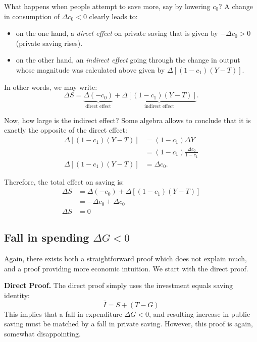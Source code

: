 \documentclass[]{book}
\theoremstyle{definition}
\theoremstyle{definition}
\theoremstyle{definition}
\theoremstyle{remark}
\begin{document}
What happens when people attempt to save more, say by lowering
\(c_{0}\)? A change in consumption of \(\Delta c_{0}<0\) clearly leads
to:

\begin{itemize}
\item
  on the one hand, a \emph{direct effect} on private saving that is
  given by \(-\Delta c_{0}>0\) (private saving rises).
\item
  on the other hand, an \emph{indirect effect} going through the change
  in output whose magnitude was calculated above given by
  \(\Delta\left[\left(1-c_{1}\right)\left(Y-T\right)\right]\).
\end{itemize}

In other words, we may write:
\[\Delta S=\underbrace{\Delta(-c_{0})}_{\text{direct effect}}+\underbrace{\Delta\left[\left(1-c_{1}\right)\left(Y-T\right)\right]}_{\text{indirect effect}}.\]

Now, how large is the indirect effect? Some algebra allows to conclude
that it is exactly the opposite of the direct effect: \[\begin{aligned}
\Delta\left[\left(1-c_{1}\right)\left(Y-T\right)\right] &=(1-c_{1})\Delta Y\\
    &=(1-c_{1})\frac{\Delta c_{0}}{1-c_{1}}\\
\Delta\left[\left(1-c_{1}\right)\left(Y-T\right)\right] &=\Delta c_{0}.
\end{aligned}
\]

Therefore, the total effect on saving is: \[\begin{aligned}
\Delta S    &=\Delta(-c_{0})+\Delta\left[\left(1-c_{1}\right)\left(Y-T\right)\right]\\
    &=-\Delta c_{0}+\Delta c_{0}\\
\Delta S    &=0
\end{aligned}
\]

\subsection{\texorpdfstring{Fall in spending
\(\Delta G<0\)}{Fall in spending \textbackslash{}Delta G\textless{}0}}\label{fall-in-spending-delta-g0}

Again, there exists both a straightforward proof which does not explain
much, and a proof providing more economic intuition. We start with the
direct proof.

\textbf{Direct Proof.} The direct proof simply uses the investment
equals saving identity: \[\bar{I} = S + (T-G)\] This implies that a fall
in expenditure \(\Delta G<0\), and resulting increase in public saving
must be matched by a fall in private saving. However, this proof is
again, somewhat disappointing.
\end{document}
